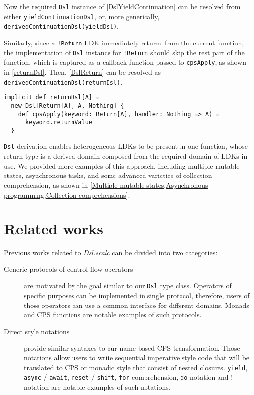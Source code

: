 Now the required \lstinline{Dsl} instance of \cref{DslYieldContinuation} can be resolved from either \lstinline{yieldContinuationDsl}, or, more generically, \lstinline{derivedContinuationDsl(yieldDsl)}.


Similarly, since a \lstinline{!Return} LDK immediately returns from the current function, the implementation of \lstinline{Dsl} instance for \lstinline{!Return} should skip the rest part of the function, which is captured as a callback function passed to \lstinline{cpsApply}, as shown in \cref{returnDsl}. Then, \cref{DslReturn} can be resolved as \lstinline{derivedContinuationDsl(returnDsl)}.

\begin{lstlisting}[caption={The \lstinline{Dsl} instance of \lstinline{Return} LDK, to skip the registered callback function},label={returnDsl}]
implicit def returnDsl[A] =
  new Dsl[Return[A], A, Nothing] {
    def cpsApply(keyword: Return[A], handler: Nothing => A) =
      keyword.returnValue
  }
\end{lstlisting}

\lstinline{Dsl} derivation enables heterogeneous LDKs to be present in one function, whose return type is a derived domain composed from the required domain of LDKs in use. We provided more examples of this approach, including multiple mutable states, asynchronous tasks, and some advanced varieties of collection comprehension, as shown in \cref{Multiple mutable states,Asynchronous programming,Collection comprehensions}.

\section{Related works}

Previous works related to \textit{Dsl.scala} can be divided into two categories:

\begin{description}
  \item[Generic protocols of control flow operators] are motivated by the goal similar to our \lstinline{Dsl} type class. Operators of specific purposes can be implemented in single protocol, therefore, users of those operators can use a common interface for different domains. Monads and CPS functions are notable examples of such protocols.
  \item[Direct style notations] provide similar syntaxes to our name-based CPS transformation. Those notations allow users to write sequential imperative style code that will be translated to CPS or monadic style that consist of nested closures. \lstinline{yield}, \lstinline{async} / \lstinline{await}, \lstinline{reset} / \lstinline{shift}, \lstinline{for}-comprehension, \lstinline{do}-notation and !-notation are notable examples of such notations.
\end{description}

